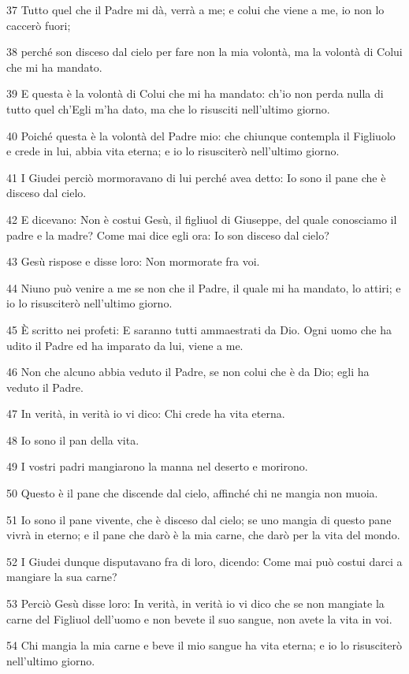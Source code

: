\par 37 Tutto quel che il Padre mi dà, verrà a me; e colui che viene a me, io non lo caccerò fuori;
\par 38 perché son disceso dal cielo per fare non la mia volontà, ma la volontà di Colui che mi ha mandato.
\par 39 E questa è la volontà di Colui che mi ha mandato: ch'io non perda nulla di tutto quel ch'Egli m'ha dato, ma che lo risusciti nell'ultimo giorno.
\par 40 Poiché questa è la volontà del Padre mio: che chiunque contempla il Figliuolo e crede in lui, abbia vita eterna; e io lo risusciterò nell'ultimo giorno.
\par 41 I Giudei perciò mormoravano di lui perché avea detto: Io sono il pane che è disceso dal cielo.
\par 42 E dicevano: Non è costui Gesù, il figliuol di Giuseppe, del quale conosciamo il padre e la madre? Come mai dice egli ora: Io son disceso dal cielo?
\par 43 Gesù rispose e disse loro: Non mormorate fra voi.
\par 44 Niuno può venire a me se non che il Padre, il quale mi ha mandato, lo attiri; e io lo risusciterò nell'ultimo giorno.
\par 45 È scritto nei profeti: E saranno tutti ammaestrati da Dio. Ogni uomo che ha udito il Padre ed ha imparato da lui, viene a me.
\par 46 Non che alcuno abbia veduto il Padre, se non colui che è da Dio; egli ha veduto il Padre.
\par 47 In verità, in verità io vi dico: Chi crede ha vita eterna.
\par 48 Io sono il pan della vita.
\par 49 I vostri padri mangiarono la manna nel deserto e morirono.
\par 50 Questo è il pane che discende dal cielo, affinché chi ne mangia non muoia.
\par 51 Io sono il pane vivente, che è disceso dal cielo; se uno mangia di questo pane vivrà in eterno; e il pane che darò è la mia carne, che darò per la vita del mondo.
\par 52 I Giudei dunque disputavano fra di loro, dicendo: Come mai può costui darci a mangiare la sua carne?
\par 53 Perciò Gesù disse loro: In verità, in verità io vi dico che se non mangiate la carne del Figliuol dell'uomo e non bevete il suo sangue, non avete la vita in voi.
\par 54 Chi mangia la mia carne e beve il mio sangue ha vita eterna; e io lo risusciterò nell'ultimo giorno.

